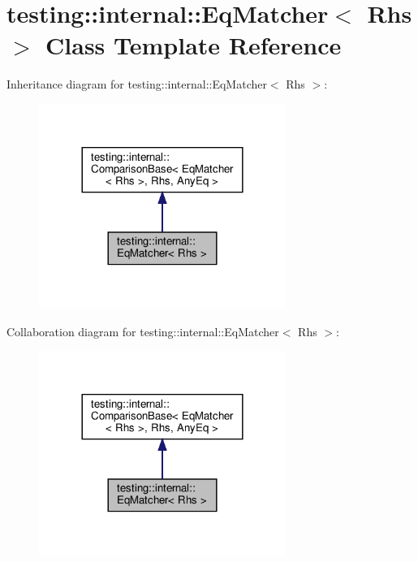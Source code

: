 \hypertarget{classtesting_1_1internal_1_1_eq_matcher}{}\section{testing\+:\+:internal\+:\+:Eq\+Matcher$<$ Rhs $>$ Class Template Reference}
\label{classtesting_1_1internal_1_1_eq_matcher}


Inheritance diagram for testing\+:\+:internal\+:\+:Eq\+Matcher$<$ Rhs $>$\+:
\nopagebreak
\begin{figure}[H]
\begin{center}
\leavevmode
\includegraphics[width=228pt]{classtesting_1_1internal_1_1_eq_matcher__inherit__graph}
\end{center}
\end{figure}


Collaboration diagram for testing\+:\+:internal\+:\+:Eq\+Matcher$<$ Rhs $>$\+:
\nopagebreak
\begin{figure}[H]
\begin{center}
\leavevmode
\includegraphics[width=228pt]{classtesting_1_1internal_1_1_eq_matcher__coll__graph}
\end{center}
\end{figure}
